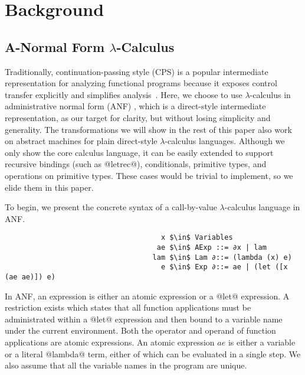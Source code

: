 \documentclass[acmsmall, review]{acmart}\settopmatter{}
\begin{document}
\section{Background} \label{background}

\subsection{A-Normal Form $\lambda$-Calculus} \label{anfsyntax}

Traditionally, continuation-passing style (CPS) is a popular intermediate representation
for analyzing functional programs because it exposes control transfer explicitly and 
simplifies analysis~\cite{Shivers:1991:SSC:115865.115884, Shivers:1988:CFA:53990.54007}.
Here, we choose to use $\lambda$-calculus in administrative normal form (ANF)
\cite{flanagan1993essence}, which is a direct-style intermediate representation, as our 
target for clarity, but without losing simplicity and generality. The transformations 
we will show in the rest of this paper also work on abstract machines for plain 
direct-style $\lambda$-calculus languages. Although we only show the core calculus language,
it can be easily extended to support recursive bindings (such as @letrec@), conditionals, 
primitive types, and operations on primitive types. These cases would be trivial to implement,
so we elide them in this paper.

To begin, we present the concrete syntax of a call-by-value $\lambda$-calculus language
in ANF.

\begin{lstlisting}
                                     x $\in$ Variables
                                    ae $\in$ AExp ::= ∂x | lam
                                   lam $\in$ Lam ∂::= (lambda (x) e)
                                     e $\in$ Exp ∂::= ae | (let ([x (ae ae)]) e)
\end{lstlisting}

In ANF, an expression is either an atomic expression or a @let@ expression.
A restriction exists which states that all function applications must be administrated
within a @let@ expression and then bound to a variable name under the current environment.
Both the operator and operand of function applications are atomic expressions.
An atomic expression $ae$ is either a variable or a literal @lambda@ term, either of which
can be evaluated in a single step. We also assume that all the variable names in the program
 are unique.
\end{document}
